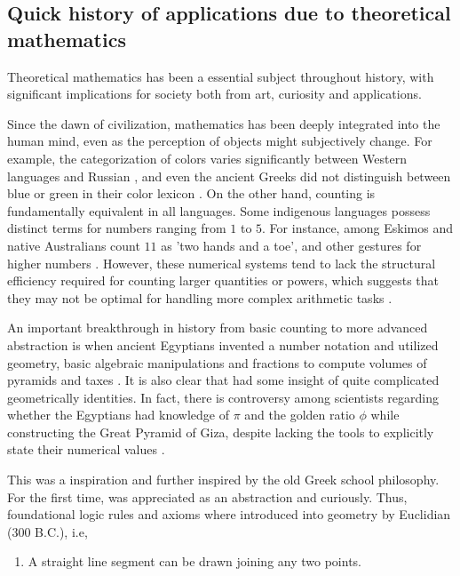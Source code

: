 \documentclass[10pt,twocolumn]{article}
\begin{document}
\begin{sloppy}
\section*{Quick history of applications due to theoretical mathematics}\label{sec:introduction}

Theoretical mathematics has been a essential subject throughout history, with significant implications for society both from art, curiosity and applications.

Since the dawn of civilization, mathematics has been deeply integrated into the human mind, even as the perception of objects might subjectively change. For example, the categorization of colors varies significantly between Western languages and
Russian \cite{maier2018native}, and even the ancient Greeks did not distinguish between blue or green in their color lexicon \cite{durao2022did}. On the other hand, counting is fundamentally equivalent in all languages. Some indigenous languages
possess distinct terms for numbers ranging from $1$ to $5$. For instance, among Eskimos and native Australians count $11$ as 'two hands and a toe', and other gestures for higher numbers \cite{gow2010short}.  However, these numerical systems tend to lack the structural efficiency required for counting larger quantities or powers, which suggests that they may not be optimal for handling more complex arithmetic tasks \cite{beller2008limits}.

An important breakthrough in history from basic counting to more advanced abstraction is when ancient Egyptians invented a number notation and utilized geometry, basic algebraic manipulations and fractions to compute volumes of pyramids and taxes \cite{imhausen2016mathematics}. It is also clear that had some insight of quite complicated geometrically identities. In fact, there is controversy among scientists regarding whether the Egyptians had knowledge of $\pi$ and the golden ratio $\phi$ while constructing the Great Pyramid of Giza, despite lacking the tools to explicitly state their numerical values \cite{robins1985mathematical}.

This was a inspiration and further inspired by the old Greek school philosophy. For the first time, was appreciated as an abstraction and curiously. Thus, foundational logic rules and axioms where introduced into geometry by Euclidian (300 B.C.),
i.e,
\begin{enumerate}
    \item  A straight line segment can be drawn joining any two points.


\end{enumerate}
\end{sloppy}
\end{document}
